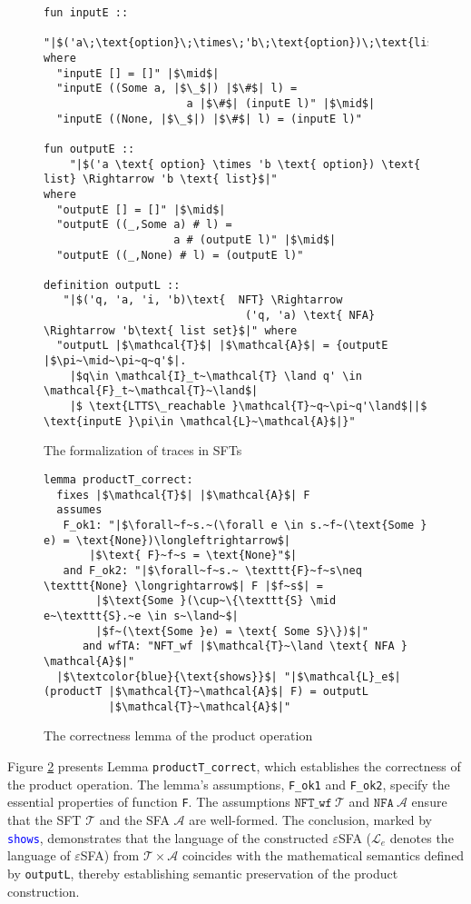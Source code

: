 \begin{figure}[hbt!]
	\begin{lstlisting}
fun inputE :: 
   "|$('a\;\text{option}\;\times\;'b\;\text{option})\;\text{list}\;\Rightarrow\;'a\;\text{list}$|"
where
  "inputE [] = []" |$\mid$|
  "inputE ((Some a, |$\_$|) |$\#$| l) = 
                      a |$\#$| (inputE l)" |$\mid$|
  "inputE ((None, |$\_$|) |$\#$| l) = (inputE l)"

fun outputE :: 
    "|$('a \text{ option} \times 'b \text{ option}) \text{ list} \Rightarrow 'b \text{ list}$|" 
where
  "outputE [] = []" |$\mid$|
  "outputE ((_,Some a) # l) = 
                    a # (outputE l)" |$\mid$|
  "outputE ((_,None) # l) = (outputE l)"

definition outputL :: 
   "|$('q, 'a, 'i, 'b)\text{  NFT} \Rightarrow 
                               ('q, 'a) \text{ NFA} \Rightarrow 'b\text{ list set}$|" where
  "outputL |$\mathcal{T}$| |$\mathcal{A}$| = {outputE |$\pi~\mid~\pi~q~q'$|. 
    |$q\in \mathcal{I}_t~\mathcal{T} \land q' \in \mathcal{F}_t~\mathcal{T}~\land$| 
    |$ \text{LTTS\_reachable }\mathcal{T}~q~\pi~q'\land$||$ \text{inputE }\pi\in \mathcal{L}~\mathcal{A}$|}"
	\end{lstlisting}
\caption{The formalization of traces in SFTs}
\label{fig-def-output}
\end{figure}


\begin{figure}[hbt!]
	\begin{lstlisting}
lemma productT_correct:
  fixes |$\mathcal{T}$| |$\mathcal{A}$| F
  assumes 
   F_ok1: "|$\forall~f~s.~(\forall e \in s.~f~(\text{Some } e) = \text{None})\longleftrightarrow$|
       |$\text{ F}~f~s = \text{None}"$|
   and F_ok2: "|$\forall~f~s.~ \texttt{F}~f~s\neq \texttt{None} \longrightarrow$| F |$f~s$| = 
        |$\text{Some }(\cup~\{\texttt{S} \mid e~\texttt{S}.~e \in s~\land~$|
        |$f~(\text{Some }e) = \text{ Some S}\})$|"
      and wfTA: "NFT_wf |$\mathcal{T}~\land \text{ NFA } \mathcal{A}$|"
  |$\textcolor{blue}{\text{shows}}$| "|$\mathcal{L}_e$| (productT |$\mathcal{T}~\mathcal{A}$| F) = outputL 
          |$\mathcal{T}~\mathcal{A}$|"

	\end{lstlisting}
\caption{The correctness lemma of the product operation}
\label{fig-def-product-correct}
\end{figure}

Figure \ref{fig-def-product-correct} presents Lemma \texttt{productT\_correct}, which establishes the correctness of the product operation. The lemma's assumptions, \texttt{F\_ok1} and \texttt{F\_ok2}, specify the essential properties of function \texttt{F}. 
The assumptions $\texttt{NFT\_wf}~\mathcal{T}$ and $\texttt{NFA}~\mathcal{A}$ ensure that the SFT $\mathcal{T}$ and the SFA $\mathcal{A}$ are well-formed.
The conclusion, marked by \textcolor{blue}{\texttt{shows}}, demonstrates that the language of the constructed $\varepsilon$SFA ($\mathcal{L}_e$ denotes the language of $\varepsilon$SFA) from $\mathcal{T} \times \mathcal{A}$ coincides with the mathematical semantics defined by \texttt{outputL}, thereby establishing semantic preservation of the product construction.

